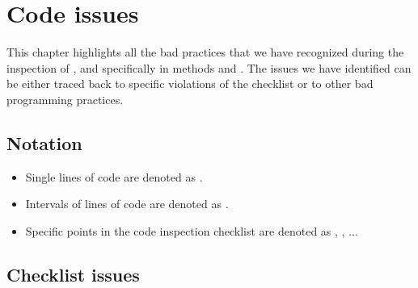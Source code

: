 \chapter{Code issues}
This chapter highlights all the bad practices that we have recognized during the inspection of , and specifically in methods  and . The issues we have identified can be either traced back to specific violations of the checklist or to other bad programming practices. 

\section{Notation}
\begin{itemize}
    \item Single lines of code are denoted as .
    \item Intervals of lines of code are denoted as .
    \item Specific points in the code inspection checklist are denoted as , , ... 
\end{itemize}
\section{Checklist issues}

